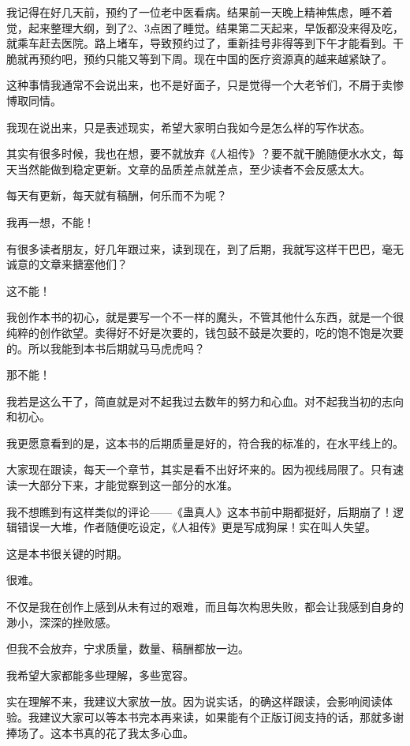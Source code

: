 \begin{this_body}
我记得在好几天前，预约了一位老中医看病。结果前一天晚上精神焦虑，睡不着觉，起来整理大纲，到了2、3点困了睡觉。结果第二天起来，早饭都没来得及吃，就乘车赶去医院。路上堵车，导致预约过了，重新挂号非得等到下午才能看到。干脆就再预约吧，预约只能又等到下周。现在中国的医疗资源真的越来越紧缺了。

这种事情我通常不会说出来，也不是好面子，只是觉得一个大老爷们，不屑于卖惨博取同情。

我现在说出来，只是表述现实，希望大家明白我如今是怎么样的写作状态。

其实有很多时候，我也在想，要不就放弃《人祖传》？要不就干脆随便水水文，每天当然能做到稳定更新。文章的品质差点就差点，至少读者不会反感太大。

每天有更新，每天就有稿酬，何乐而不为呢？

我再一想，不能！

有很多读者朋友，好几年跟过来，读到现在，到了后期，我就写这样干巴巴，毫无诚意的文章来搪塞他们？

这不能！

我创作本书的初心，就是要写一个不一样的魔头，不管其他什么东西，就是一个很纯粹的创作欲望。卖得好不好是次要的，钱包鼓不鼓是次要的，吃的饱不饱是次要的。所以我能到本书后期就马马虎虎吗？

那不能！

我若是这么干了，简直就是对不起我过去数年的努力和心血。对不起我当初的志向和初心。

我更愿意看到的是，这本书的后期质量是好的，符合我的标准的，在水平线上的。

大家现在跟读，每天一个章节，其实是看不出好坏来的。因为视线局限了。只有速读一大部分下来，才能觉察到这一部分的水准。

我不想瞧到有这样类似的评论——《蛊真人》这本书前中期都挺好，后期崩了！逻辑错误一大堆，作者随便吃设定，《人祖传》更是写成狗屎！实在叫人失望。

这是本书很关键的时期。

很难。

不仅是我在创作上感到从未有过的艰难，而且每次构思失败，都会让我感到自身的渺小，深深的挫败感。

但我不会放弃，宁求质量，数量、稿酬都放一边。

我希望大家都能多些理解，多些宽容。

实在理解不来，我建议大家放一放。因为说实话，的确这样跟读，会影响阅读体验。我建议大家可以等本书完本再来读，如果能有个正版订阅支持的话，那就多谢捧场了。这本书真的花了我太多心血。


\end{this_body}
